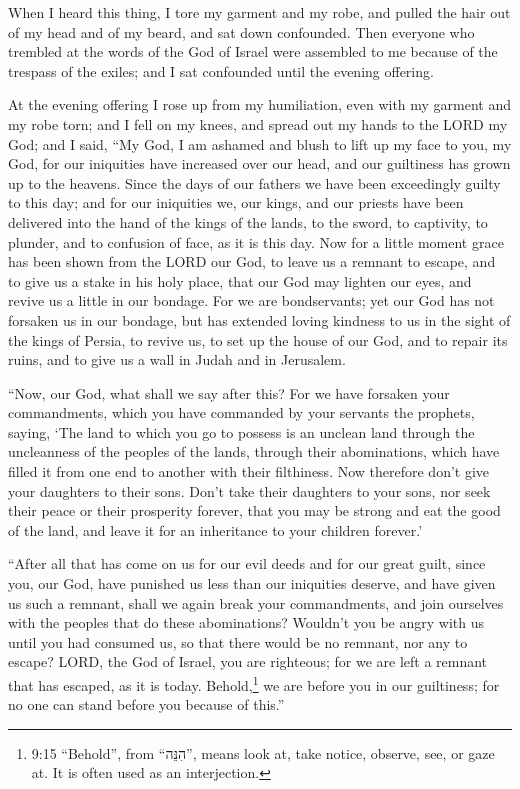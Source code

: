 \myverse{}When I heard this thing, I tore my garment and my robe, and pulled
the hair out of my head and of my beard, and sat down confounded.
\myverse{}Then everyone who trembled at the words of the God of Israel were assembled
to me because of the trespass of the exiles; and I sat confounded until the evening offering.

\myverse{}At the evening offering I rose up from my humiliation, even with
my garment and my robe torn; and I fell on my knees, and spread out my hands to the LORD my God;
\myverse{}and I said, “My God, I am ashamed and blush to lift up my face to you, my God,
for our iniquities have increased over our head, and our guiltiness has grown up to the heavens.
\myverse{}Since the days of our fathers we have been exceedingly guilty to this day; and
for our iniquities we, our kings, and our priests have been delivered into the hand of the kings of the
lands, to the sword, to captivity, to plunder, and to confusion of face, as it is this day.
\myverse{}Now for a little moment grace has been shown from the LORD our God, to leave
us a remnant to escape, and to give us a stake in his holy place, that our God may lighten our eyes, and
revive us a little in our bondage.
\myverse{}For we are bondservants; yet our God has not forsaken us in our bondage, but
has extended loving kindness to us in the sight of the kings of Persia, to revive us, to set up the house
of our God, and to repair its ruins, and to give us a wall in Judah and in Jerusalem.

\myverse{}“Now, our God, what shall we say after this? For we have forsaken
your commandments,
\myverse{}which you have commanded by your servants the prophets, saying, ‘The land
to which you go to possess is an unclean land through the uncleanness of the peoples of the lands, through
their abominations, which have filled it from one end to another with their filthiness.
\myverse{}Now therefore don’t give your daughters to their sons. Don’t take their daughters
to your sons, nor seek their peace or their prosperity forever, that you may be strong and eat the good
of the land, and leave it for an inheritance to your children forever.’

\myverse{}“After all that has come on us for our evil deeds and for our
great guilt, since you, our God, have punished us less than our iniquities deserve, and have given us
such a remnant,
\myverse{}shall we again break your commandments, and join ourselves with the peoples
that do these abominations? Wouldn’t you be angry with us until you had consumed us, so that there would
be no remnant, nor any to escape?
\myverse{}LORD, the God of Israel, you are righteous; for we are left a remnant that
has escaped, as it is today. Behold,\footnote{9:15 “Behold”, from “הִנֵּה”, means look at, take notice, observe, see, or gaze at. It is
	often used as an interjection.} we are before you in our guiltiness; for no one can stand before
you because of this.”


